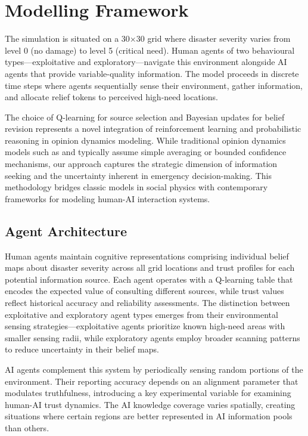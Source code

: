\documentclass[pdflatex,sn-apa]{sn-jnl}%
\begin{document}
\section{Modelling Framework}

The simulation is situated on a 30×30 grid where disaster severity varies from level 0 (no damage) to level 5 (critical need). Human agents of two behavioural types—exploitative and exploratory—navigate this environment alongside AI agents that provide variable-quality information. The model proceeds in discrete time steps where agents sequentially sense their environment, gather information, and allocate relief tokens to perceived high-need locations.

The choice of Q-learning for source selection and Bayesian updates for belief revision represents a novel integration of reinforcement learning and probabilistic reasoning in opinion dynamics modeling. While traditional opinion dynamics models such as \citet{deffuant2000mixing} and \citet{hegselmann2002opinion} typically assume simple averaging or bounded confidence mechanisms, our approach captures the strategic dimension of information seeking and the uncertainty inherent in emergency decision-making. This methodology bridges classic models in social physics with contemporary frameworks for modeling human-AI interaction systems.

\subsection{Agent Architecture}

Human agents maintain cognitive representations comprising individual belief maps about disaster severity across all grid locations and trust profiles for each potential information source. Each agent operates with a Q-learning table that encodes the expected value of consulting different sources, while trust values reflect historical accuracy and reliability assessments. The distinction between exploitative and exploratory agent types emerges from their environmental sensing strategies—exploitative agents prioritize known high-need areas with smaller sensing radii, while exploratory agents employ broader scanning patterns to reduce uncertainty in their belief maps.

AI agents complement this system by periodically sensing random portions of the environment. Their reporting accuracy depends on an alignment parameter that modulates truthfulness, introducing a key experimental variable for examining human-AI trust dynamics. The AI knowledge coverage varies spatially, creating situations where certain regions are better represented in AI information pools than others.
\end{document}
